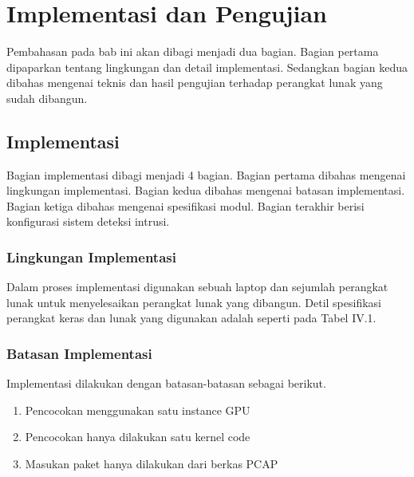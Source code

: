 
\chapter{Implementasi dan Pengujian}

Pembahasan pada bab ini akan dibagi menjadi dua bagian. Bagian pertama dipaparkan tentang lingkungan dan detail implementasi. Sedangkan bagian kedua dibahas mengenai teknis dan hasil pengujian terhadap perangkat lunak yang sudah dibangun.

\section{Implementasi}

  Bagian implementasi dibagi menjadi 4 bagian. Bagian pertama dibahas mengenai lingkungan implementasi. Bagian kedua dibahas mengenai batasan implementasi. Bagian ketiga dibahas mengenai spesifikasi modul. Bagian terakhir berisi konfigurasi sistem deteksi intrusi.

  \subsection{Lingkungan Implementasi}

    Dalam proses implementasi digunakan sebuah laptop dan sejumlah perangkat lunak untuk menyelesaikan perangkat lunak yang dibangun. Detil spesifikasi perangkat keras dan lunak yang digunakan adalah seperti pada Tabel IV.1.
    
    

  \subsection{Batasan Implementasi}

    Implementasi dilakukan dengan batasan-batasan sebagai berikut.

    \begin{enumerate}

      \item
      Pencocokan menggunakan satu instance GPU \\
    
      \item
      Pencocokan hanya dilakukan satu kernel code \\
    
      \item
      Masukan paket hanya dilakukan dari berkas PCAP \\
    

    \end{enumerate}

